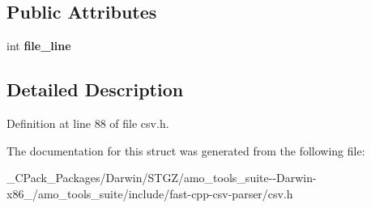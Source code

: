 \subsection*{Public Attributes}
\begin{DoxyCompactItemize}
\item 
\mbox{\label{structio_1_1error_1_1with__file__line_a391298c37172bcdb83aeb3daf65d5a0e}} 
int {\bfseries file\+\_\+line}
\end{DoxyCompactItemize}


\subsection{Detailed Description}


Definition at line 88 of file csv.\+h.



The documentation for this struct was generated from the following file\+:\begin{DoxyCompactItemize}
\item 
\+\_\+\+C\+Pack\+\_\+\+Packages/\+Darwin/\+S\+T\+G\+Z/amo\+\_\+tools\+\_\+suite-\/-\/\+Darwin-\/x86\+\_/amo\+\_\+tools\+\_\+suite/include/fast-\/cpp-\/csv-\/parser/csv.\+h\end{DoxyCompactItemize}
